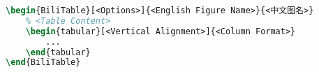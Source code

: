 \begin{lstlisting}[language=LaTeX, caption=Bilingual Table, label=listing:bilingual-table]
\begin{BiliTable}[<Options>]{<English Figure Name>}{<中文图名>}
    % <Table Content>
    \begin{tabular}[<Vertical Alignment>]{<Column Format>}
        ...
    \end{tabular}
\end{BiliTable}
\end{lstlisting}